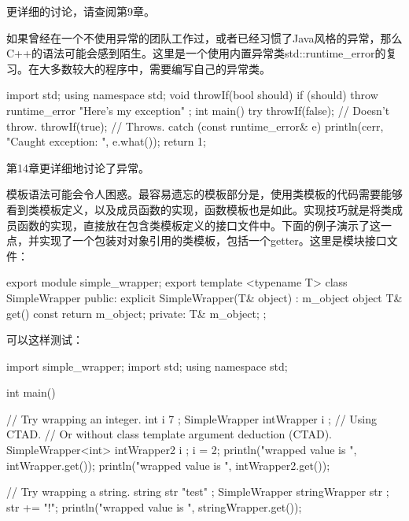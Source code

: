 更详细的讨论，请查阅第9章。


如果曾经在一个不使用异常的团队工作过，或者已经习惯了Java风格的异常，那么C++的语法可能会感到陌生。这里是一个使用内置异常类std::runtime\_error的复习。在大多数较大的程序中，需要编写自己的异常类。

\begin{cpp}
import std;
using namespace std;
void throwIf(bool should)
{
    if (should) {
        throw runtime_error { "Here's my exception" };
    }
}
int main()
{
    try {
        throwIf(false); // Doesn't throw.
        throwIf(true); // Throws.
    } catch (const runtime_error& e) {
        println(cerr, "Caught exception: {}", e.what());
        return 1;
    }
}
\end{cpp}

第14章更详细地讨论了异常。


模板语法可能会令人困惑。最容易遗忘的模板部分是，使用类模板的代码需要能够看到类模板定义，以及成员函数的实现，函数模板也是如此。实现技巧就是将类成员函数的实现，直接放在包含类模板定义的接口文件中。下面的例子演示了这一点，并实现了一个包装对对象引用的类模板，包括一个getter。这里是模块接口文件：

\begin{cpp}
export module simple_wrapper;
export template <typename T>
class SimpleWrapper
{
    public:
        explicit SimpleWrapper(T& object) : m_object { object } { }
        T& get() const { return m_object; }
    private:
        T& m_object;
};
\end{cpp}

可以这样测试：

\begin{cpp}
import simple_wrapper;
import std;
using namespace std;

int main()
{
    // Try wrapping an integer.
    int i { 7 };
    SimpleWrapper intWrapper { i }; // Using CTAD.
    // Or without class template argument deduction (CTAD).
    SimpleWrapper<int> intWrapper2 { i };
    i = 2;
    println("wrapped value is {}", intWrapper.get());
    println("wrapped value is {}", intWrapper2.get());

    // Try wrapping a string.
    string str { "test" };
    SimpleWrapper stringWrapper { str };
    str += "!";
    println("wrapped value is {}", stringWrapper.get());
}
\end{cpp}

